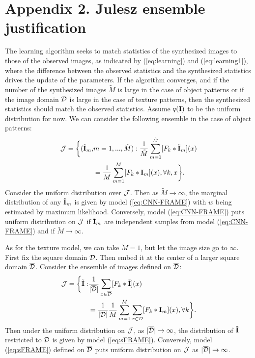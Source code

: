\documentclass[letterpaper]{article}
\def\I{{\bf I}}
\def\tI{\tilde{\bf I}}
\begin{document}
 \section*{Appendix 2.  Julesz ensemble justification}

 The learning algorithm seeks to match statistics of the synthesized images to those of the observed images, as indicated by (\ref{eq:learning}) and (\ref{eq:learning1}), where the difference between the observed statistics and the synthesized statistics drives the update of the parameters. If the algorithm converges, and if the number of the synthesized images $\tilde{M}$ is large in the case of object patterns or if the image domain ${\cal D}$ is large in the case of  texture patterns, then the synthesized statistics should match the observed statistics. Assume $q(\I)$ to be the uniform distribution for now. We can consider the following ensemble in the case of object patterns: 
 \begin{equation}
 \begin{aligned}
     {\cal J} = \bigg\{(\tilde{\I}_m, & m = 1, ..., \tilde{M}):                
    \frac{1}{\tilde{M}} \sum_{m=1}^{\tilde{M}} [F_k *\tI_m](x)\\
    & =  \frac{1}{M} \sum_{m=1}^{M} [F_k *\I_m](x), \forall k, x \bigg\}. 
  \end{aligned}
  \label{eq:Julesz1}
 \end{equation}     
Consider the uniform distribution over ${\cal J}$. Then as $\tilde{M} \rightarrow \infty$, the marginal distribution of any $\tilde{\I}_m$ is given by model (\ref{eq:CNN-FRAME}) with $w$ being estimated by maximum likelihood.  Conversely, model (\ref{eq:CNN-FRAME})  puts uniform distribution on ${\cal J}$ if $\tilde{\I}_m$ are independent samples from model (\ref{eq:CNN-FRAME}) and if $\tilde{M} \rightarrow \infty$. 

As for the texture model, we can take $\tilde{M} = 1$, but let the image size go to $\infty$. First fix the square domain ${\cal D}$. Then embed it at the center of a larger square domain $\overline{\cal D}$. Consider the ensemble of images defined on $\overline{\cal D}$: 
 \begin{equation}
 \begin{aligned}
     {\cal J} = \bigg\{\tilde{\I}:                
   &\frac{1}{|\overline{\cal D}|}\sum_{x \in \overline{\cal D}} [F_k *\tI](x) \\&=  \frac{1}{|{\cal D}|} \frac{1}{M} \sum_{m=1}^{M} \sum_{x \in {\cal D}}  [F_k *\I_m](x), \forall k \bigg\}. 
  \end{aligned}
  \label{eq:Julesz2}
 \end{equation}     
Then under the uniform distribution on ${\cal J}$, as $|\overline{\cal D}| \rightarrow \infty$, the distribution of $\tilde{\I}$ restricted to ${\cal D}$ is given by model (\ref{eq:sFRAME}). Conversely, model (\ref{eq:sFRAME}) defined on $\overline{\cal D}$ puts uniform distribution on ${\cal J}$ as $|\overline{\cal D}| \rightarrow \infty$. 
\end{document}
